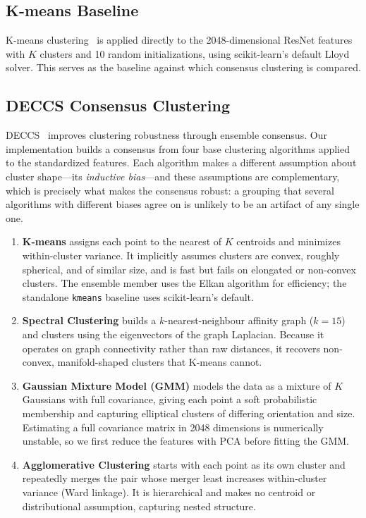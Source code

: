 \subsection{K-means Baseline}

K-means clustering~\citep{Lloyd1982} is applied directly to the 2048-dimensional ResNet features with $K$ clusters and 10 random initializations, using scikit-learn's default Lloyd solver. This serves as the baseline against which consensus clustering is compared.


\subsection{DECCS Consensus Clustering}
\label{sec:deccs_consensus}

DECCS~\citep{Miklautz2022} improves clustering robustness through ensemble consensus. Our implementation builds a consensus from four base clustering algorithms applied to the standardized features. Each algorithm makes a different assumption about cluster shape---its \emph{inductive bias}---and these assumptions are complementary, which is precisely what makes the consensus robust: a grouping that several algorithms with different biases agree on is unlikely to be an artifact of any single one.

\begin{enumerate}
    \item \textbf{K-means} assigns each point to the nearest of $K$ centroids and minimizes within-cluster variance. It implicitly assumes clusters are convex, roughly spherical, and of similar size, and is fast but fails on elongated or non-convex clusters. The ensemble member uses the Elkan algorithm for efficiency; the standalone \texttt{kmeans} baseline uses scikit-learn's default.
    \item \textbf{Spectral Clustering} builds a $k$-nearest-neighbour affinity graph ($k = 15$) and clusters using the eigenvectors of the graph Laplacian. Because it operates on graph connectivity rather than raw distances, it recovers non-convex, manifold-shaped clusters that K-means cannot.
    \item \textbf{Gaussian Mixture Model (GMM)} models the data as a mixture of $K$ Gaussians with full covariance, giving each point a soft probabilistic membership and capturing elliptical clusters of differing orientation and size. Estimating a full covariance matrix in 2048 dimensions is numerically unstable, so we first reduce the features with PCA before fitting the GMM.
    \item \textbf{Agglomerative Clustering} starts with each point as its own cluster and repeatedly merges the pair whose merger least increases within-cluster variance (Ward linkage). It is hierarchical and makes no centroid or distributional assumption, capturing nested structure.
\end{enumerate}

